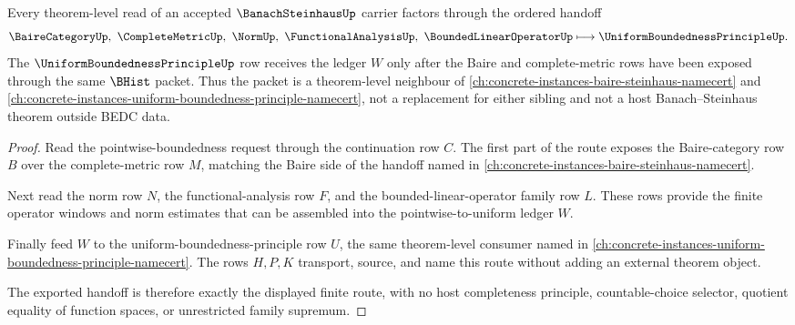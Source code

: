 \begin{theorem}
\label{thm:banach-steinhaus-baire-handoff}
Every theorem-level read of an accepted $\BanachSteinhausUp$ carrier factors through the ordered handoff
$$
\BaireCategoryUp,\ \CompleteMetricUp,\ \NormUp,\ \FunctionalAnalysisUp,\ \BoundedLinearOperatorUp \longmapsto \UniformBoundednessPrincipleUp .
$$
The $\UniformBoundednessPrincipleUp$ row receives the ledger $W$ only after the Baire and complete-metric rows have been exposed through the same $\BHist$ packet. Thus the packet is a theorem-level neighbour of \autoref{ch:concrete-instances-baire-steinhaus-namecert} and \autoref{ch:concrete-instances-uniform-boundedness-principle-namecert}, not a replacement for either sibling and not a host Banach--Steinhaus theorem outside BEDC data.
\end{theorem}
\begin{proof}
Read the pointwise-boundedness request through the continuation row $C$. The first part of the route exposes the Baire-category row $B$ over the complete-metric row $M$, matching the Baire side of the handoff named in \autoref{ch:concrete-instances-baire-steinhaus-namecert}.

Next read the norm row $N$, the functional-analysis row $F$, and the bounded-linear-operator family row $L$. These rows provide the finite operator windows and norm estimates that can be assembled into the pointwise-to-uniform ledger $W$.

Finally feed $W$ to the uniform-boundedness-principle row $U$, the same theorem-level consumer named in \autoref{ch:concrete-instances-uniform-boundedness-principle-namecert}. The rows $H,P,K$ transport, source, and name this route without adding an external theorem object.

The exported handoff is therefore exactly the displayed finite route, with no host completeness principle, countable-choice selector, quotient equality of function spaces, or unrestricted family supremum.
\end{proof}



